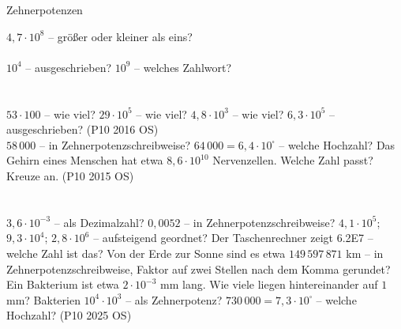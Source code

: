 \setcounter{aufgabe}{18}

\begin{aufgabe}{Zehnerpotenzen}
\begin{teile}
\teil $4{,}7 \cdot 10^{8}$ – größer oder kleiner als eins?\\  \\ 
\teil $10^{4}$ – ausgeschrieben? \leerfeld
\teil $10^{9}$ – welches Zahlwort?\\  \\  \\ 
\teil $53 \cdot 100$ – wie viel? \leerfeld
\teil $29 \cdot 10^{5}$ – wie viel? \leerfeld
\teil $4{,}8 \cdot 10^{3}$ – wie viel? \leerfeld
\teil $6{,}3 \cdot 10^{5}$ – ausgeschrieben? \hfill (P10 2016 OS) \\ \leerfeld
\teil $58\,000$ – in Zehnerpotenzschreibweise? \leerfeld
\teil $64\,000 = 6{,}4 \cdot 10^{\square}$ – welche Hochzahl? \leerfeld
\teil Das Gehirn eines Menschen hat etwa $8{,}6 \cdot 10^{10}$ Nervenzellen. Welche Zahl passt? Kreuze an. \hfill (P10 2015 OS)\\  \\  \\ 
\teil $3{,}6 \cdot 10^{-3}$ – als Dezimalzahl? \leerfeld
\teil $0{,}0052$ – in Zehnerpotenzschreibweise? \leerfeld
\teil $4{,}1 \cdot 10^{5}$; $9{,}3 \cdot 10^{4}$; $2{,}8 \cdot 10^{6}$ – aufsteigend geordnet?
\teil Der Taschenrechner zeigt 6.2E7 – welche Zahl ist das? \leerfeld
\teil Von der Erde zur Sonne sind es etwa $149\,597\,871$ km – in Zehnerpotenzschreibweise, Faktor auf zwei Stellen nach dem Komma gerundet? \leerfeld
\teil Ein Bakterium ist etwa $2 \cdot 10^{-3}$ mm lang. Wie viele liegen hintereinander auf $1$ mm? \leerfeld Bakterien
\teil $10^{4} \cdot 10^{3}$ – als Zehnerpotenz? \leerfeld
\teil $730\,000 = 7{,}3 \cdot 10^{\square}$ – welche Hochzahl? \hfill (P10 2025 OS) \\ \leerfeld
\end{teile}
\end{aufgabe}

